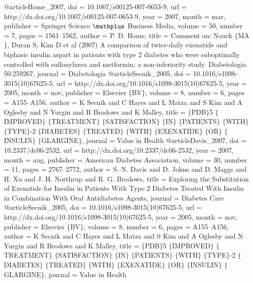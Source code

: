 @article{Home_2007,
	doi = {10.1007/s00125-007-0653-9},
	url = {http://dx.doi.org/10.1007/s00125-007-0653-9},
	year = 2007,
	month = {mar},
	publisher = {Springer Science $\mathplus$ Business Media},
	volume = {50},
	number = {7},
	pages = {1561--1562},
	author = {P. D. Home},
	title = {Comment on: Nauck $\lbrace$MA$\rbrace$, Duran S, Kim D et al (2007) A comparison of twice-daily exenatide and biphasic insulin aspart in patients with type 2 diabetes who were suboptimally controlled with sulfonylurea and metformin: a non-inferiority study. Diabetologia 50:259{\textendash}267},
	journal = {Diabetologia}
}
@article{Secnik_2005,
	doi = {10.1016/s1098-3015(10)67625-5},
	url = {http://dx.doi.org/10.1016/s1098-3015(10)67625-5},
	year = 2005,
	month = {nov},
	publisher = {Elsevier $\lbrace$BV$\rbrace$},
	volume = {8},
	number = {6},
	pages = {A155--A156},
	author = {K Secnik and C Hayes and L Matza and S Kim and A Oglesby and N Yurgin and R Brodows and K Malley},
	title = {$\lbrace$PDB$\rbrace$5 $\lbrace$IMPROVED$\rbrace$ $\lbrace$TREATMENT$\rbrace$ $\lbrace$SATISFACTION$\rbrace$ $\lbrace$IN$\rbrace$ $\lbrace$PATIENTS$\rbrace$ $\lbrace$WITH$\rbrace$ $\lbrace$TYPE$\rbrace$-2 $\lbrace$DIABETES$\rbrace$ $\lbrace$TREATED$\rbrace$ $\lbrace$WITH$\rbrace$ $\lbrace$EXENATIDE$\rbrace$ $\lbrace$OR$\rbrace$ $\lbrace$INSULIN$\rbrace$ $\lbrace$GLARGINE$\rbrace$},
	journal = {Value in Health}
}
@article{Davis_2007,
	doi = {10.2337/dc06-2532},
	url = {http://dx.doi.org/10.2337/dc06-2532},
	year = 2007,
	month = {aug},
	publisher = {American Diabetes Association},
	volume = {30},
	number = {11},
	pages = {2767--2772},
	author = {S. N. Davis and D. Johns and D. Maggs and H. Xu and J. H. Northrup and R. G. Brodows},
	title = {Exploring the Substitution of Exenatide for Insulin in Patients With Type 2 Diabetes Treated With Insulin in Combination With Oral Antidiabetes Agents},
	journal = {Diabetes Care}
}
@article{Secnik_2005,
	doi = {10.1016/s1098-3015(10)67625-5},
	url = {http://dx.doi.org/10.1016/s1098-3015(10)67625-5},
	year = 2005,
	month = {nov},
	publisher = {Elsevier $\lbrace$BV$\rbrace$},
	volume = {8},
	number = {6},
	pages = {A155--A156},
	author = {K Secnik and C Hayes and L Matza and S Kim and A Oglesby and N Yurgin and R Brodows and K Malley},
	title = {$\lbrace$PDB$\rbrace$5 $\lbrace$IMPROVED$\rbrace$ $\lbrace$TREATMENT$\rbrace$ $\lbrace$SATISFACTION$\rbrace$ $\lbrace$IN$\rbrace$ $\lbrace$PATIENTS$\rbrace$ $\lbrace$WITH$\rbrace$ $\lbrace$TYPE$\rbrace$-2 $\lbrace$DIABETES$\rbrace$ $\lbrace$TREATED$\rbrace$ $\lbrace$WITH$\rbrace$ $\lbrace$EXENATIDE$\rbrace$ $\lbrace$OR$\rbrace$ $\lbrace$INSULIN$\rbrace$ $\lbrace$GLARGINE$\rbrace$},
	journal = {Value in Health}
}
